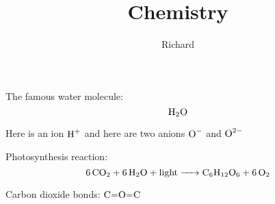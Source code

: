 \documentclass[a4paper,11pt]{report}
\title{Chemistry}
\author{Richard}
\begin{document}
\maketitle

The famous water molecule: \[\ce{ H2O }\]

Here is an ion \(\ce{ H+ } \) and here are two anions \(\ce{ O- }\) and \(\ce{ O^2- } \) 

 Photosynthesis reaction: \[\ce{6 CO2 + 6 H2O + light -> C6H12O6 + 6 O2}\]

Carbon dioxide bonds: \(\ce{ C=O=C }\)

\begin{center}
\\
\\
\\
\\
\\
\\
\\
\\
\\

\end{center}
\end{document}
